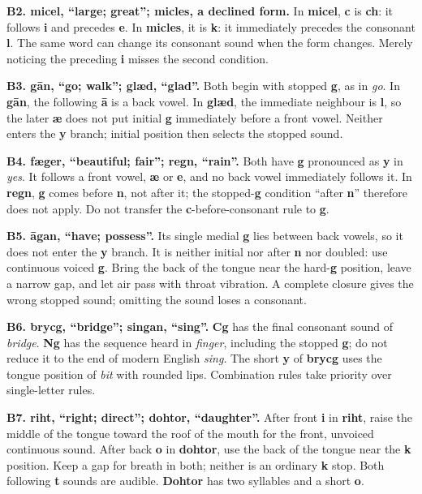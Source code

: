 \textbf{B2. micel, “large; great”; micles, a declined form.} In \textbf{micel}, \textbf{c} is \textbf{ch}: it follows \textbf{i} and precedes \textbf{e}. In \textbf{micles}, it is \textbf{k}: it immediately precedes the consonant \textbf{l}. The same word can change its consonant sound when the form changes. Merely noticing the preceding \textbf{i} misses the second condition.

\textbf{B3. gān, “go; walk”; glæd, “glad”.} Both begin with stopped \textbf{g}, as in \emph{go}. In \textbf{gān}, the following \textbf{ā} is a back vowel. In \textbf{glæd}, the immediate neighbour is \textbf{l}, so the later \textbf{æ} does not put initial \textbf{g} immediately before a front vowel. Neither enters the \textbf{y} branch; initial position then selects the stopped sound.

\textbf{B4. fæger, “beautiful; fair”; regn, “rain”.} Both have \textbf{g} pronounced as \textbf{y} in \emph{yes}. It follows a front vowel, \textbf{æ} or \textbf{e}, and no back vowel immediately follows it. In \textbf{regn}, \textbf{g} comes before \textbf{n}, not after it; the stopped-\textbf{g} condition “after \textbf{n}” therefore does not apply. Do not transfer the \textbf{c}-before-consonant rule to \textbf{g}.

\textbf{B5. āgan, “have; possess”.} Its single medial \textbf{g} lies between back vowels, so it does not enter the \textbf{y} branch. It is neither initial nor after \textbf{n} nor doubled: use continuous voiced \textbf{g}. Bring the back of the tongue near the hard-\textbf{g} position, leave a narrow gap, and let air pass with throat vibration. A complete closure gives the wrong stopped sound; omitting the sound loses a consonant.

\textbf{B6. brycg, “bridge”; singan, “sing”.} \textbf{Cg} has the final consonant sound of \emph{bridge}. \textbf{Ng} has the sequence heard in \emph{finger}, including the stopped \textbf{g}; do not reduce it to the end of modern English \emph{sing}. The short \textbf{y} of \textbf{brycg} uses the tongue position of \emph{bit} with rounded lips. Combination rules take priority over single-letter rules.

\textbf{B7. riht, “right; direct”; dohtor, “daughter”.} After front \textbf{i} in \textbf{riht}, raise the middle of the tongue toward the roof of the mouth for the front, unvoiced continuous sound. After back \textbf{o} in \textbf{dohtor}, use the back of the tongue near the \textbf{k} position. Keep a gap for breath in both; neither is an ordinary \textbf{k} stop. Both following \textbf{t} sounds are audible. \textbf{Dohtor} has two syllables and a short \textbf{o}.


